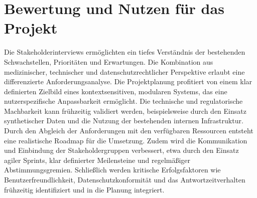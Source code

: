 \section{Bewertung und Nutzen für das Projekt}
Die Stakeholderinterviews ermöglichten ein tiefes Verständnis der bestehenden Schwachstellen, Prioritäten und Erwartungen. Die Kombination aus medizinischer, technischer und datenschutzrechtlicher Perspektive erlaubt eine differenzierte Anforderungsanalyse.
Die Projektplanung profitiert von einem klar definierten Zielbild eines kontextsensitiven, modularen Systems, das eine nutzerspezifische Anpassbarkeit ermöglicht. Die technische und regulatorische Machbarkeit kann frühzeitig validiert werden, beispielsweise durch den Einsatz synthetischer Daten und die Nutzung der bestehenden internen Infrastruktur. Durch den Abgleich der Anforderungen mit den verfügbaren Ressourcen entsteht eine realistische Roadmap für die Umsetzung. Zudem wird die Kommunikation und Einbindung der Stakeholdergruppen verbessert, etwa durch den Einsatz agiler Sprints, klar definierter Meilensteine und regelmäßiger Abstimmungsgremien. Schließlich werden kritische Erfolgsfaktoren wie Benutzerfreundlichkeit, Datenschutzkonformität und das Antwortzeitverhalten frühzeitig identifiziert und in die Planung integriert.


